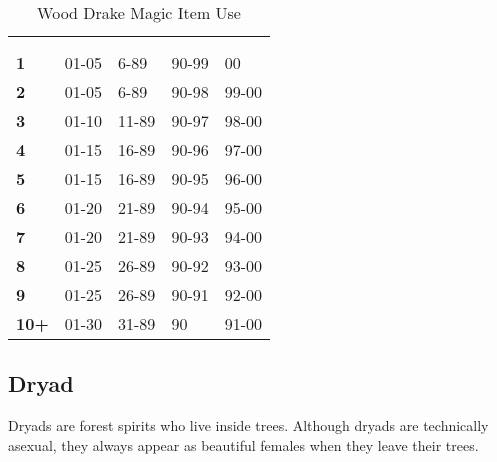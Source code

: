 \begin{multicols*}{2}
\begin {table}[H]
  \caption{Wood Drake Magic Item Use}\label{tab:Wood Drake Magic Item Use}
  \begin{tabularx}{\columnwidth}{>{\bfseries}YYYYY}
	\thead{} & \\
	 &  &  &  & \\
	1 & 01-05 & 6-89 & 90-99 & 00\\
	2 & 01-05 & 6-89 & 90-98 & 99-00\\
	3 & 01-10 & 11-89 & 90-97 & 98-00\\
	4 & 01-15 & 16-89 & 90-96 & 97-00\\
	5 & 01-15 & 16-89 & 90-95 & 96-00\\
	6 & 01-20 & 21-89 & 90-94 & 95-00\\
	7 & 01-20 & 21-89 & 90-93 & 94-00\\
	8 & 01-25 & 26-89 & 90-92 & 93-00\\
	9 & 01-25 & 26-89 & 90-91 & 92-00\\
	10+ & 01-30 & 31-89 & 90 & 91-00
  \end {tabularx}
\end {table}

\subsection{Dryad}

Dryads are forest spirits who live inside trees. Although dryads are technically asexual, they always appear as beautiful females when they leave their trees.


\end{multicols*}
